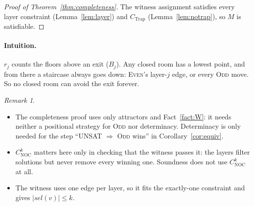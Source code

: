 \documentclass{article}
\theoremstyle{definition}
\theoremstyle{remark}
\newtheorem*{remark}{Remark}
\newcommand{\Even}{\textsc{Even}}
\newcommand{\Odd}{\textsc{Odd}}
\newcommand{\sel}{\mathit{sel}}
\newcommand{\CNOC}{C_{\mathrm{NOC}}}
\newcommand{\CTrap}{C_{\mathrm{Trap}}}
\begin{document}
\begin{proof}[Proof of Theorem~\ref{thm:completeness}]
The witness assignment satisfies every layer constraint
(Lemma~\ref{lem:layer}) and $\CTrap$ (Lemma~\ref{lem:notrap}), so $M$ is
satisfiable.
\end{proof}

\paragraph{Intuition.} $r_j$ counts the floors above an exit ($B_j$). Any
closed room has a lowest point, and from there a staircase always goes down:
\Even{}'s layer-$j$ edge, or every \Odd{} move. So no closed room can avoid the
exit forever.

\begin{remark}
\leavevmode
\begin{itemize}
  \item The completeness proof uses only attractors and Fact~\ref{fact:W}: it
    needs neither a positional strategy for \Odd{} nor determinacy.
    Determinacy is only needed for the step ``UNSAT $\Rightarrow$ \Odd{}
    wins'' in Corollary~\ref{cor:equiv}.
  \item $\CNOC^{k}$ matters here only in checking that the witness passes it:
    the layers filter solutions but never remove every winning one.
    Soundness does not use $\CNOC^{k}$ at all.
  \item The witness uses one edge per layer, so it fits the exactly-one
    constraint and gives $|\sel(v)| \le k$.
\end{itemize}
\end{remark}

\end{document}
